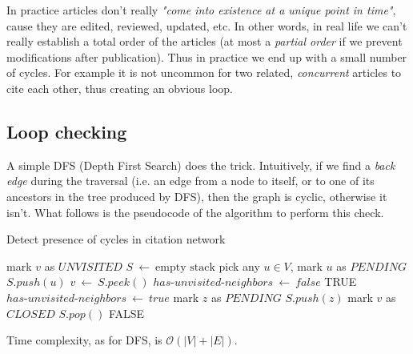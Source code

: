 In practice articles don't really \textit{"come into existence at a unique point in time"}, cause they are edited, reviewed, updated, etc.
In other words, in real life we can't really establish a total order of
the articles (at most a \textit{partial order} if we prevent modifications
after publication). Thus in practice we end up with a small number of
cycles. For example it is not uncommon for two
related, \textit{concurrent} articles to cite each other, thus creating an
obvious loop.

\subsection{Loop checking}

A simple DFS (Depth First Search) does the trick. Intuitively, if we find a
\textit{back edge} during the traversal (i.e. an edge from a node to
itself, or to one of its ancestors in the tree produced by DFS), then
the graph is cyclic, otherwise it isn't. What follows is the pseudocode 
of the algorithm to perform this check.
\newpage
\begin{algorithm}
	\caption{Detect presence of cycles in citation network}
	\label{loop_check}
	\begin{algorithmic}[1]
			\State mark $v$ as $UNVISITED$
		\EndFor
		\State $S \ \leftarrow \ \text{empty stack}$
		\State pick any $u \in V$, mark $u$ as $PENDING$
		\State $S.push(u)$
			\State $v \ \leftarrow \ S.peek()$
			\State $has\text{-}unvisited\text{-}neighbors \ \leftarrow \ false$
					\State \Return TRUE
					\State $has\text{-}unvisited\text{-}neighbors \ \leftarrow \ true$
					\State mark $z$ as $PENDING$
					\State $S.push(z)$
				\EndIf
			\EndFor
				\State mark $v$ as $CLOSED$
				\State $S.pop()$
			\EndIf
		\EndWhile
		\State \Return FALSE
	\end{algorithmic}
\end{algorithm}
\medskip

\noindent Time complexity, as for DFS, is $\mathcal{O}(|V|+|E|)$.
